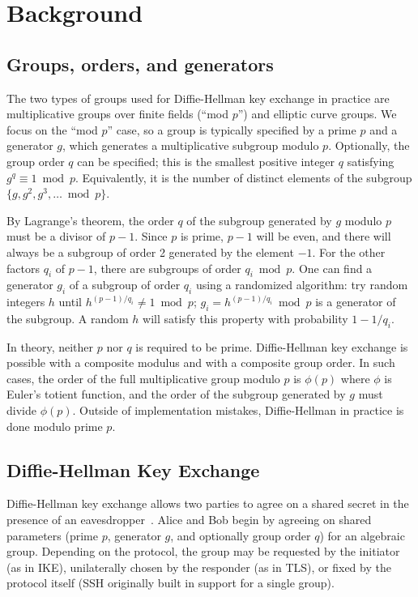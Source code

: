 
\section{Background}

\subsection{Groups, orders, and generators}
\label{sec:group-background}

The two types of groups used for Diffie-Hellman key exchange in practice are
multiplicative groups over finite fields (``mod $p$'') and elliptic curve
groups. We focus on the ``mod $p$'' case, so a group is typically specified by
a prime $p$ and a generator $g$, which generates a multiplicative subgroup
modulo $p$.  Optionally, the group order $q$ can be specified; this is the
smallest positive integer $q$ satisfying $g^q \equiv 1 \bmod p$.  Equivalently,
it is the number of distinct elements of the subgroup $\{g, g^2, g^3, \dots
\bmod p\}$.

By Lagrange's theorem, the order $q$ of the subgroup generated by $g$ modulo
$p$ must be a divisor of $p-1$. Since $p$ is prime, $p-1$ will be even, and
there will always be a subgroup of order 2 generated by the element $-1$. For
the other factors $q_i$ of $p-1$, there are subgroups of order $q_i \bmod p$.
One can find a generator $g_i$ of a subgroup of order $q_i$ using a randomized
algorithm: try random integers $h$ until $h^{(p-1)/q_i} \ne 1 \bmod p$; $g_i =
h^{(p-1)/q_i} \bmod p$ is a generator of the subgroup.  A random $h$ will
satisfy this property with probability $1 - 1/q_i$.

In theory, neither $p$ nor $q$ is required to be prime. Diffie-Hellman key
exchange is possible with a composite modulus and with a composite group order.
In such cases, the order of the full multiplicative group modulo $p$ is
$\phi(p)$ where $\phi$ is Euler's totient function, and the order of the
subgroup generated by $g$ must divide $\phi(p)$. Outside of implementation
mistakes, Diffie-Hellman in practice is done modulo prime $p$.

\subsection{Diffie-Hellman Key Exchange}

Diffie-Hellman key exchange allows two parties to agree on a shared secret in
the presence of an eavesdropper~\cite{new-directions-in-crypto-1976}. Alice and Bob begin by
agreeing on shared parameters (prime $p$, generator $g$, and optionally group
order $q$) for an algebraic group.  Depending on the protocol, the group may be
requested by the initiator (as in IKE), unilaterally chosen by the responder
(as in TLS), or fixed by the protocol itself (SSH originally built in support
for a single group).


